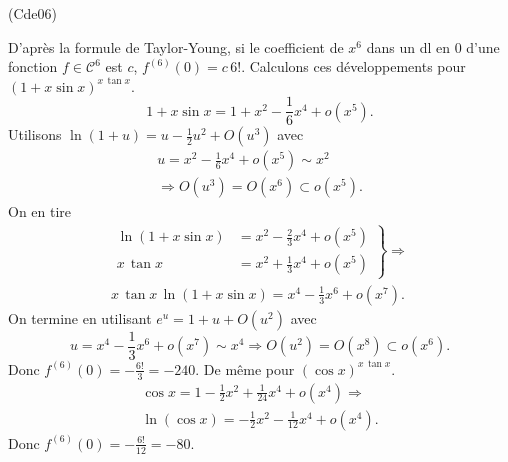 \begin{tiny}(Cde06)\end{tiny} D'après la formule de Taylor-Young, si le coefficient de $x^6$ dans un dl en $0$ d'une fonction $f \in \mathcal{C}^6$ est $c$,
$f^{(6)}(0) = c \, 6!$.\newline
Calculons ces développements pour $(1+x\sin x) ^{x\, \tan x}$.
\[
  1 + x \sin x = 1 + x^2 - \frac{1}{6}x^4 + o(x^5).
\]
Utilisons $\ln(1+u) = u - \frac{1}{2}u^2 + O(u^3)$ avec
\begin{multline*}
  u = x^2 - \frac{1}{6}x^4 + o(x^5) \sim x^2 \\
  \Rightarrow O(u^3) = O(x^6) \subset o(x^5).
\end{multline*}
On en tire
\begin{multline*}
\left.
\begin{aligned}
  \ln(1 + x\sin x) &= x^2 - \frac{2}{3}x^4 + o(x^5) \\
  x\,\tan x &= x^2 + \frac{1}{3}x^4 + o(x^5)
\end{aligned} \right\rbrace 
\Rightarrow \\
x\,\tan x\, \ln(1 + x\sin x)
= x^4 - \frac{1}{3}x^6 + o(x^7).
\end{multline*}
On termine en utilisant $e^u = 1 + u + O(u^2)$ avec 
\[
  u = x^4 - \frac{1}{3}x^6 + o(x^7) \sim x^4 
  \Rightarrow O(u^2) = O(x^8) \subset o(x^6).
\]
Donc $f^{(6)}(0) = -\frac{6!}{3} = -240$.\newline
De même pour $(\cos x) ^{x\, \tan x}$.
\begin{multline*}
  \cos x = 1 - \frac{1}{2}x^2 + \frac{1}{24}x^4 + o(x^4) \Rightarrow \\
  \ln(\cos x) = - \frac{1}{2}x^2 - \frac{1}{12}x^4 + o(x^4).
\end{multline*}
Donc $f^{(6)}(0) = -\frac{6!}{12} = -80$.
